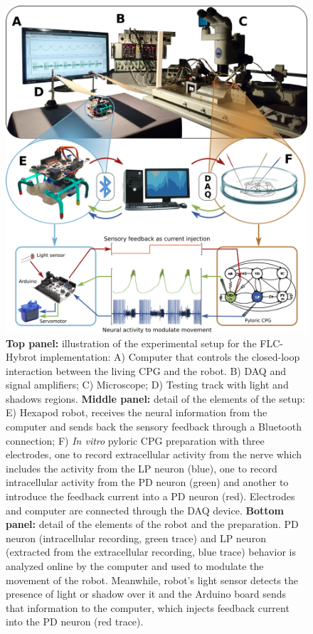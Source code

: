 \begin{figure}[h!]
	\begin{center}
		\includegraphics[width=0.65\linewidth]{img/invariants/robot/robot_results_setup.png}
	\end{center}
	\caption{\textbf{Top panel:} illustration of the experimental setup for the FLC-Hybrot implementation: A) Computer that controls the closed-loop interaction between the living CPG and the robot. B) DAQ and signal amplifiers; C) Microscope; D) Testing track with light and shadows regions. \textbf{Middle panel:} detail of the elements of the setup: E) Hexapod robot, receives the neural information from the computer and sends back the sensory feedback through a Bluetooth connection; F) \textit{In vitro} pyloric CPG preparation with three electrodes, one to record extracellular activity from the nerve which includes the activity from the LP neuron (blue), one to record intracellular activity from the PD neuron (green) and another to introduce the feedback current into a PD neuron (red). Electrodes and computer are connected through the DAQ device. \textbf{Bottom panel:} detail of the elements of the robot and the preparation. PD neuron (intracellular recording, green trace) and LP neuron (extracted from the extracellular recording, blue trace) behavior is analyzed online by the computer and used to modulate the movement of the robot. Meanwhile, robot's light sensor detects the presence of light or shadow over it and the Arduino board sends that information to the computer, which injects feedback current into the PD neuron (red trace).}
	\label{fig:robot_results_setup}
\end{figure}



\newpage




